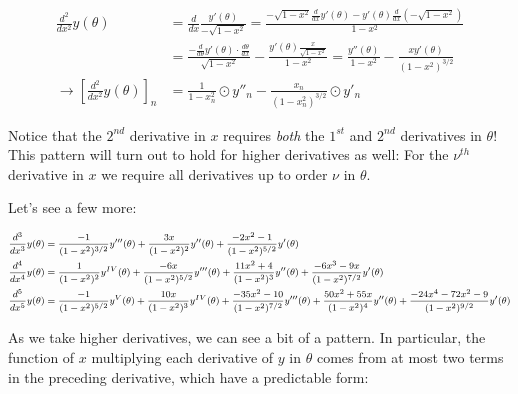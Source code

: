 \documentclass[10pt]{article}
\begin{document}
\begin{equation}\label{2nd}
\begin{aligned}
\frac{d^2}{dx^2} y(\theta) &= \frac{d}{dx} \frac{y'(\theta)}{-\sqrt{1-x^2}} = \frac{-\sqrt{1-x^2} \frac{d}{dx} y'(\theta) - y'(\theta) \frac{d}{dx} (-\sqrt{1-x^2})}{1 - x^2} \\
&= \frac{-\frac{d}{d\theta}y'(\theta)\cdot \frac{d\theta}{dx}}{\sqrt{1-x^2}} - \frac{y'(\theta)\frac{x}{\sqrt{1-x^2}}}{1 - x^2} = \frac{y''(\theta)}{1-x^2} - \frac{x y'(\theta)}{(1 - x^2)^{3/2}} \\
\longrightarrow [\frac{d^2}{dx^2} y(\theta)]_n &= \frac{1}{1-x_n^2} \odot y''_n - \frac{x_n}{(1 - x_n^2)^{3/2}} \odot y'_n
\end{aligned}
\end{equation}\vspace{2mm}

Notice that the $2^{nd}$ derivative in $x$ requires \textit{both} the $1^{st}$ and $2^{nd}$ derivatives in $\theta$! This pattern will turn out to hold for higher derivatives as well: For the $\nu^{th}$ derivative in $x$ we require all derivatives up to order $\nu$ in $\theta$.

Let's see a few more:

\begin{equation}\label{derivatives}
\footnotesize
\begin{aligned}
\frac{d^3}{dx^3} y(\theta) &= \frac{-1}{(1-x^2)^{3/2}} y'''(\theta) + \frac{3x}{(1-x^2)^2} y''(\theta) + \frac{-2x^2 - 1}{(1-x^2)^{5/2}} y'(\theta)\\
\frac{d^4}{dx^4} y(\theta) &= \frac{1}{(1-x^2)^2} y^{IV}(\theta) + \frac{-6x}{(1-x^2)^{5/2}} y'''(\theta) + \frac{11x^2 + 4}{(1-x^2)^3} y''(\theta) + \frac{-6x^3 - 9x}{(1-x^2)^{7/2}} y'(\theta)\\
\frac{d^5}{dx^5} y(\theta) &= \frac{-1}{(1-x^2)^{5/2}} y^V(\theta) + \frac{10x}{(1-x^2)^3} y^{IV}(\theta) + \frac{-35x^2-10}{(1-x^2)^{7/2}} y'''(\theta) + \frac{50x^2 + 55x}{(1-x^2)^4} y''(\theta) + \frac{-24x^4 -72x^2 - 9}{(1-x^2)^{9/2}} y'(\theta)\\
\end{aligned}
\normalsize
\end{equation}\vspace{2mm}

As we take higher derivatives, we can see a bit of a pattern. In particular, the function of $x$ multiplying each derivative of $y$ in $\theta$ comes from at most two terms in the preceding derivative, which have a predictable form:
\end{document}
